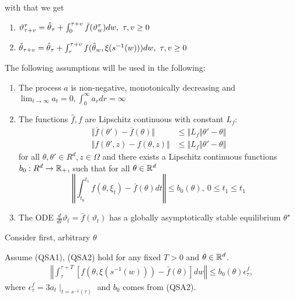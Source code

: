 with that we get 
\begin{enumerate}
    \item \(\vartheta_{\tau+v}^\tau=\thetahat_\tau+\int_0^{\tau+v}\bar{f}(\vartheta_w^\tau)dw,\ \tau,v\geq 0\)
    \item \({\hat{\theta}}_{\tau+v}={\hat{\theta}}_\tau+\int_\tau^{\tau+v} f({\hat{\theta}}_w,\xi(s^{-1}(w)))dw,\ \tau,v\geq 0\)
\end{enumerate}

The following assumptions will be used in the following:
\begin{enumerate}
    \item[\highlight{QSA1}] The process \(a\) is non-negative, monotonically decreasing and \(\lim_{t\to\infty} a_t=0,\int_0^\infty a_rdr=\infty\) 
    \item[\highlight{QSA2}] The functions \(\hat{f},f\) are Lipschitz continuous with constant \(L_f\):\begin{align*}
        \Vert \bar{f}(\theta')-\bar{f}(\theta)\Vert &\leq \Vert L_f \Vert \theta'-\theta\Vert\\
        \Vert f(\theta',z)-f(\theta,z)\Vert &\leq \Vert L_f \Vert \theta'-\theta\Vert
    \end{align*} for all \(\theta,\theta'\in R^d,z\in\Omega\) and there exists a Lipschitz continuous functions \(b_0:R^d\to\mathbb{R}_+\), such that for all \(\theta\in\mathbb{R}^d\) 
\[\left\Vert \int_{t_0}^{t_1}f(\theta,\xi_t)-\bar{f}(\theta)dt\right\Vert\leq b_0(\theta),\ 0\leq t_1\leq t_1\]
    \item[\highlight{QSA3}] The ODE \(\frac{d}{dt}\vartheta_t=\bar{f}(\vartheta_t)\) 
    has a globally asymptotically stable equilibrium \(\theta^\star\) 
\end{enumerate}
Consider first, arbitrary \(\theta\)
\begin{lemma}\label{lem:37}
    Assume (QSA1), (QSA2) hold for any fixed \(T>0\) and \(\theta\in\mathbb{R}^d\).
    \begin{align*}
        \left\Vert\int_{\tau}^{\tau+T}\left[f(\theta,\xi(s^{-1}(w)))-\bar{f}(\theta)\right]dw \right\Vert\leq b_0(\theta)\epsilon_\tau^f,
    \end{align*}   
    where \(\epsilon_\tau^f=3a_t\mid_{t=s^{-1}(\tau)}\) and \(b_0\) comes from (QSA2).
\end{lemma}
